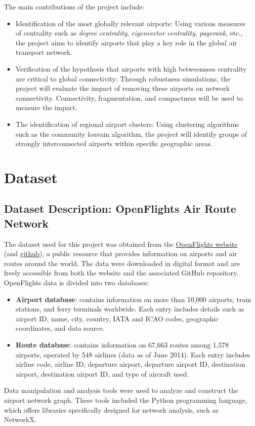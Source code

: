 \documentclass[12pt]{article}
\begin{document}
    The main contributions of the project include:

    \begin{itemize}
        \item Identification of the most globally relevant airports: Using various measures of centrality such as \textit{degree centrality}, \textit{eigenvector centrality}, \textit{pagerank}, etc., the project aims to identify airports that play a key role in the global air transport network.
        \item Verification of the hypothesis that airports with high betweenness centrality are critical to global connectivity: Through robustness simulations, the project will evaluate the impact of removing these airports on network connectivity. Connectivity, fragmentation, and compactness will be used to measure the impact.
        \item The identification of regional airport clusters: Using clustering algorithms such as the community louvain algorithm, the project will identify groups of strongly interconnected airports within specific geographic areas.
    \end{itemize}


    \section{Dataset}\label{sec:dataset}

    \subsection{Dataset Description: OpenFlights Air Route Network}\label{subsec:dataset-description:-openflights-air-route-network}
    The dataset used for this project was obtained from the \hyperlink{https://openflights.org/}{OpenFlights website} (and \hyperlink{https://github.com/jpatokal/openflights}{github}), a public resource that provides information on airports and air routes around the world.
    The data were downloaded in digital format and are freely accessible from both the website and the associated GitHub repository.
    OpenFlights data is divided into two databases:
    \begin{itemize}
        \item \textbf{Airport database}: contains information on more than 10,000 airports, train stations, and ferry terminals worldwide. Each entry includes details such as airport ID, name, city, country, IATA and ICAO codes, geographic coordinates, and data source.
        \item \textbf{Route database}: contains information on 67,663 routes among 1,578 airports, operated by 548 airlines (data as of June 2014). Each entry includes airline code, airline ID, departure airport, departure airport ID, destination airport, destination airport ID, and type of aircraft used.
    \end{itemize}
    Data manipulation and analysis tools were used to analyze and construct the airport network graph. These tools included the Python programming language, which offers libraries specifically designed for network analysis, such as NetworkX.
\end{document}
